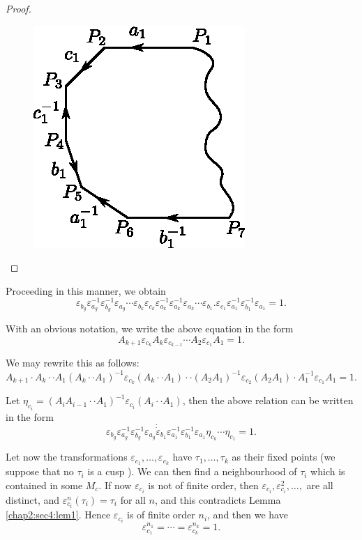 \begin{proof}
  \begin{figure}[H]
    \centerline{\includegraphics{vol9-figures/fig9-5.eps}}
  \end{figure}

\end{proof}

Proceeding in this manner, we obtain
$$
\varepsilon_{b_g}
\varepsilon_{a_g}^{-1}\varepsilon_{b_g}^{-1}\varepsilon_{a_g}\cdots
\varepsilon_{b_k}\varepsilon_{c_k} \varepsilon_{a_k}^{-1}
\varepsilon_{a_k}^{-1} \varepsilon_{a_k} \cdots
\varepsilon_{b_1}. \varepsilon_{c_1}
\varepsilon_{a_1}^{-1}\varepsilon_{b_1}^{-1} \varepsilon_{a_1} =1.  
$$

With an obvious notation, we write the above equation in the form 
$$
A_{k+1} \varepsilon_{c_k} A_k \varepsilon_{c_{ k-1}} \cdots A_2
\varepsilon_{c_1} A_1 = 1.  
$$

We may rewrite this as follows:  
$$
A_{k+1} \cdot A_k \cdot \cdot A_1 (A_k \cdot \cdot A_1 )^{-1}
\varepsilon_{c_k} (A_k \cdot \cdot A_1) \cdot \cdot (A_2 A_1)^{-1}
\varepsilon_{c_2} (A_2 A_1)\cdot A_1 ^{-1}\varepsilon_{c_1} A_1 = 1.  
$$

Let $\eta_{c_i} = (A_i A_{i-1} \cdot \cdot A_1 )^{-1}
\varepsilon_{c_i}(A_i \cdot \cdot A_1)$, then the above relation can be
written in the form 
$$ 
\varepsilon_{b_g}\varepsilon_{a_g}^{-1}\varepsilon_{b_g}^{-1}\varepsilon_{a_g}
\dot \dot \varepsilon_{b_1}
\varepsilon_{a_1}^{-1}\varepsilon_{b_1}^{-1} \varepsilon_{a_1}
\eta_{c_k} \cdots \eta_{c_1} = 1.  
$$

 Let now the transformations $\varepsilon_{c_1},  \ldots,
 \varepsilon_{c_k}$ have $\tau_1,  \ldots,  \tau_k$ as their fixed
 points (we suppose that no $\tau_i$ is a cusp ). We can then find a
 neighbourhood of $\tau_i$ which is contained in some $M_c$. If now
 $\varepsilon _{c_i}$ is not of finite order, then $\varepsilon_{c_i},
 \varepsilon_{c_i}^{2}, \ldots,  $ are all distinct, and\pageoriginale
 $\varepsilon_{c_i}^{n} (\tau_i) = \tau_i $ for all $n$, and this
 contradicts Lemma \ref{chap2:sec4:lem1}. Hence $\varepsilon_{c_i}$ is
 of finite order $n_i$, and then we have  
$$
\varepsilon_{c_1}^{n_1} = \cdots = \varepsilon_{c_k}^{n_k}= 1. 
$$

